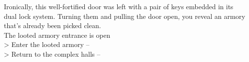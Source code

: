 Ironically, this well-fortified door was left with a pair of keys embedded in its dual lock system. Turning them and pulling the door open, you reveal an armory that's already been picked clean.\\
 The looted armory entrance is open\\

> Enter the looted armory -- \\ 
> Return to the complex halls -- 